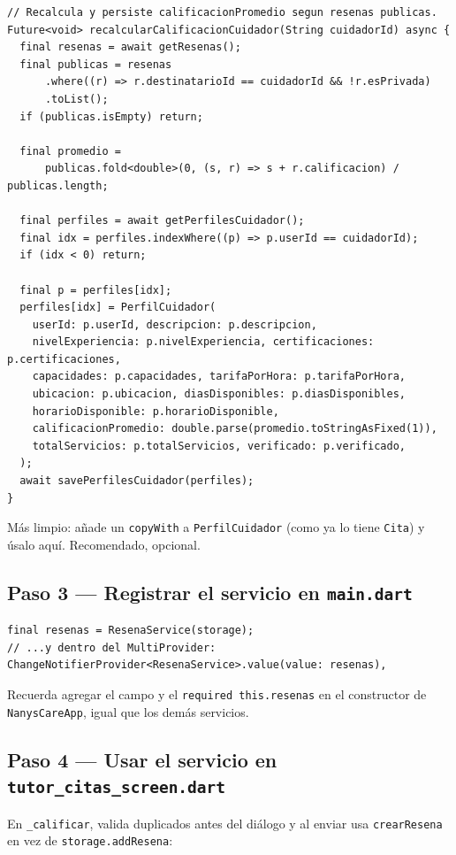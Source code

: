 \documentclass[11pt,a4paper]{article}
\begin{document}
\begin{lstlisting}
// Recalcula y persiste calificacionPromedio segun resenas publicas.
Future<void> recalcularCalificacionCuidador(String cuidadorId) async {
  final resenas = await getResenas();
  final publicas = resenas
      .where((r) => r.destinatarioId == cuidadorId && !r.esPrivada)
      .toList();
  if (publicas.isEmpty) return;

  final promedio =
      publicas.fold<double>(0, (s, r) => s + r.calificacion) / publicas.length;

  final perfiles = await getPerfilesCuidador();
  final idx = perfiles.indexWhere((p) => p.userId == cuidadorId);
  if (idx < 0) return;

  final p = perfiles[idx];
  perfiles[idx] = PerfilCuidador(
    userId: p.userId, descripcion: p.descripcion,
    nivelExperiencia: p.nivelExperiencia, certificaciones: p.certificaciones,
    capacidades: p.capacidades, tarifaPorHora: p.tarifaPorHora,
    ubicacion: p.ubicacion, diasDisponibles: p.diasDisponibles,
    horarioDisponible: p.horarioDisponible,
    calificacionPromedio: double.parse(promedio.toStringAsFixed(1)),
    totalServicios: p.totalServicios, verificado: p.verificado,
  );
  await savePerfilesCuidador(perfiles);
}
\end{lstlisting}

\begin{tip}
Más limpio: añade un \texttt{copyWith} a \texttt{PerfilCuidador} (como ya lo
tiene \texttt{Cita}) y úsalo aquí. Recomendado, opcional.
\end{tip}

\subsection{Paso 3 — Registrar el servicio en \texttt{main.dart}}
\begin{lstlisting}
final resenas = ResenaService(storage);
// ...y dentro del MultiProvider:
ChangeNotifierProvider<ResenaService>.value(value: resenas),
\end{lstlisting}
Recuerda agregar el campo y el \texttt{required this.resenas} en el constructor
de \texttt{NanysCareApp}, igual que los demás servicios.

\subsection{Paso 4 — Usar el servicio en \texttt{tutor\_citas\_screen.dart}}
En \texttt{\_calificar}, valida duplicados antes del diálogo y al enviar usa
\texttt{crearResena} en vez de \texttt{storage.addResena}:
\end{document}
